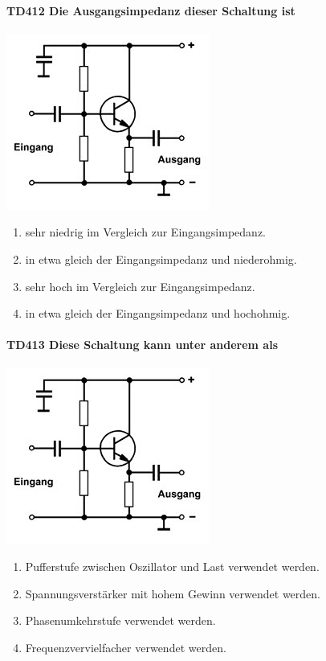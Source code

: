 \documentclass[8pt]{article}
\begin{document}
\begin{enumerate}
\begin{enumerate}[nolistsep,label=\Alph*]
\paragraph*{TD412 Die Ausgangsimpedanz dieser Schaltung ist} 
\begin{center}
	\begin{minipage}{\linewidth}
		\centering
		\includegraphics[scale=1.0]{pics/td412_a.jpg}
	\end{minipage}
\end{center}
\begin{enumerate}[nolistsep,label=\Alph*]
\item sehr niedrig im Vergleich zur Eingangsimpedanz.
\item in etwa gleich der Eingangsimpedanz und niederohmig.
\item sehr hoch im Vergleich zur Eingangsimpedanz.
\item in etwa gleich der Eingangsimpedanz und hochohmig.
\end{enumerate}

\paragraph*{TD413 Diese Schaltung kann unter anderem als} 
\begin{center}
	\begin{minipage}{\linewidth}
		\centering
		\includegraphics[scale=1.0]{pics/td413_a.jpg}
	\end{minipage}
\end{center}
\begin{enumerate}[nolistsep,label=\Alph*]
\item Pufferstufe zwischen Oszillator und Last verwendet werden.
\item Spannungsverstärker mit hohem Gewinn verwendet werden.
\item Phasenumkehrstufe verwendet werden.
\item Frequenzvervielfacher verwendet werden.
\end{enumerate}


\end{enumerate}
\end{enumerate}
\end{document}
